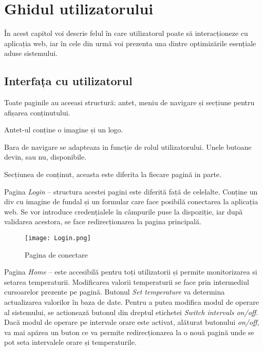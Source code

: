 \chapter{Ghidul utilizatorului}\label{ch:5interfataUtilizator}

	În acest capitol voi descrie felul în care utilizatorul poate să interacționeze cu aplicația web, iar în cele din urmă voi prezenta una dintre optimizările esențiale aduse sistemului.

\section{Interfața cu utilizatorul}

	Toate paginile au aceeasi structură: antet, meniu de navigare și secțiune pentru afișarea conținutului.

	Antet-ul conține o imagine și un logo.
	
	Bara de navigare se adapteaza in funcție de rolul utilizatorului. Unele butoane devin, sau nu, disponibile.
	
	Secțiunea de conținut, aceasta este diferita la fiecare pagină in parte.
	
\vspace{1em}

	Pagina \textit{Login} – structura acestei pagini este diferită față de celelalte. Conține un div cu imagine de fundal și un formular care face posibilă conectarea la aplicația web. Se vor introduce credențialele în câmpurile puse la dispoziție, iar după validarea acestora, se face redirecționarea la pagina principală.

\begin{figure}[H]
   	\centering
    	\texttt{[image: Login.png]}
	\caption{Pagina de conectare}
\end{figure}

	Pagina \textit{Home} – este accesibilă pentru toți utilizatorii și permite monitorizarea si setarea temperaturii. Modificarea valorii temperaturii se face prin intermediul cursoarelor prezente pe pagină. Butonul \textit{Set temperature} va determina actualizarea valorilor în baza de date. Pentru a putea modifica modul de operare al sistemului, se actionează butonul din dreptul etichetei \textit{Switch intervals on/off}. Dacă modul de operare pe intervale orare este activat, alăturat butonului \textit{on/off}, va mai apărea un buton ce va permite redirecționarea la o nouă pagină unde se pot seta intervalele orare și temperaturile.

